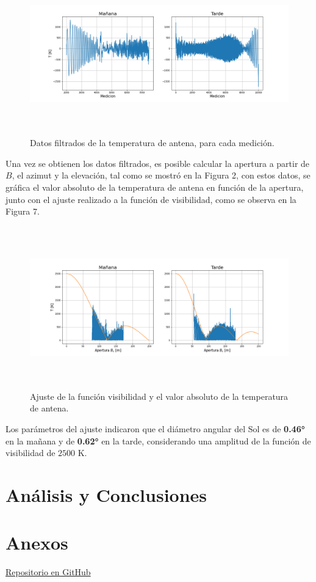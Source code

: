 \documentclass[letterpaper,oneside]{article}
\begin{document}
\begin{figure}
  \centering
  \includegraphics[height=7cm]{../graficos/cleandata.png}
  \caption{Datos filtrados de la temperatura de antena, para cada medición.}
\end{figure}

Una vez se obtienen los datos filtrados, es posible calcular la apertura a partir de $B$, el azimut y la elevación, tal como se mostró en la Figura 2, con estos datos, se gráfica el valor absoluto de la temperatura de antena en función de la apertura, junto con el ajuste realizado a la función de visibilidad, como se observa en la Figura 7.

\begin{figure}
  \centering
  \includegraphics[height=7cm]{../graficos/ajuste.png}
  \caption{Ajuste de la función visibilidad y el valor absoluto de la temperatura de antena.}
\end{figure}

Los parámetros del ajuste indicaron que el diámetro angular del Sol es de \textbf{0.46°} en la mañana y de \textbf{0.62°} en la tarde, considerando una amplitud de la función de visibilidad de $2500$ K.

\section{Análisis y Conclusiones}


\section{Anexos}
\href{https://github.com/vecheto/astro_experimental/tree/main/Tarea\%202}{Repositorio en GitHub}
\end{document}
